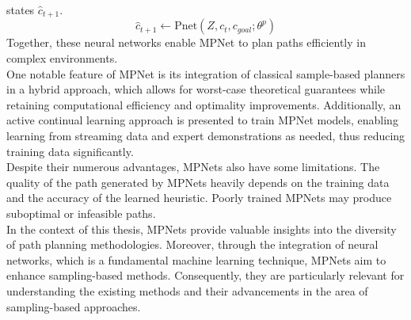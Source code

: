 \documentclass{ctuthesis}
\begin{document}
states \( \hat{c}_{t+1} \).
\[
  \hat{c}_{t+1} \leftarrow \text{Pnet}(Z, c_t, c_{goal}; \theta^p)  
\]
Together, these neural networks enable MPNet to plan paths efficiently in complex environments.
\\[12pt]
One notable feature of MPNet is its integration of classical 
sample-based planners in a hybrid approach, 
which allows for worst-case theoretical guarantees while retaining computational efficiency and 
optimality improvements. 
Additionally, an active continual learning approach is presented to train MPNet models, 
enabling learning from streaming data and expert demonstrations as needed, 
thus reducing training data significantly.
\\[12pt]
Despite their numerous advantages, MPNets also have some limitations. 
The quality of the path generated by MPNets heavily depends on the training data and 
the accuracy of the learned heuristic. 
Poorly trained MPNets may produce suboptimal or infeasible paths. 
\\[12pt]
In the context of this thesis, 
MPNets provide valuable insights into the diversity of path planning methodologies. 
Moreover, through the integration of neural networks, 
which is a fundamental machine learning technique, 
MPNets aim to enhance sampling-based methods. 
Consequently, they are particularly relevant for understanding the existing methods and 
their advancements in the area of sampling-based approaches.

\end{document}
